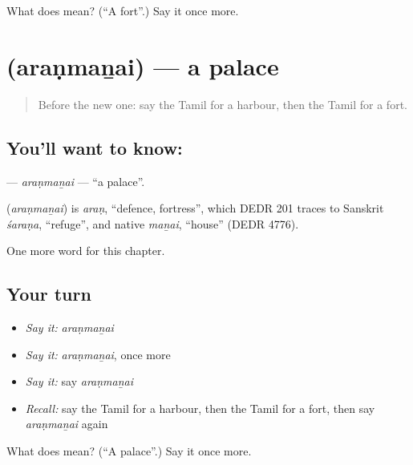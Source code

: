 \begin{tcolorbox}[breakable,colback=teal!4,colframe=teal!35!black,title={Before you move on}]
What does  mean? (\textquotedblleft{}A fort\textquotedblright{}.) Say it once more.
\end{tcolorbox}
\section[\texorpdfstring{\ta{அரண்மனை} (araṇmaṉai)}{அரண்மனை (araṇmaṉai)}]{ (araṇmaṉai) — a palace}

\label{lesson:TA-C236-aranmanai}



\begin{quote}
Before the new one: say the Tamil for a harbour, then the Tamil for a fort.
\end{quote}

\subsection*{You'll want to know: }
\textbf{} — \emph{araṇmaṉai} — \textquotedblleft{}a palace\textquotedblright{}.

\begin{cousinweb}
\textbf{} (\emph{araṇmaṉai}) is \emph{araṇ}, \textquotedblleft{}defence, fortress\textquotedblright{}, which DEDR 201 traces to Sanskrit \emph{śaraṇa}, \textquotedblleft{}refuge\textquotedblright{}, and native \emph{maṉai}, \textquotedblleft{}house\textquotedblright{} (DEDR 4776).
\end{cousinweb}

\begin{grammarlens}[title={What you've built}]
One more word for this chapter.
\end{grammarlens}

\subsection*{Your turn}
\begin{itemize}
\raggedright
  \item \emph{Say it:} \emph{araṇmaṉai}
  \item \emph{Say it:} \emph{araṇmaṉai}, once more
  \item \emph{Say it:} say \emph{araṇmaṉai}
  \item \emph{Recall:} say the Tamil for a harbour, then the Tamil for a fort, then say \emph{araṇmaṉai} again
\end{itemize}

\begin{tcolorbox}[breakable,colback=teal!4,colframe=teal!35!black,title={Before you move on}]
What does  mean? (\textquotedblleft{}A palace\textquotedblright{}.) Say it once more.
\end{tcolorbox}
